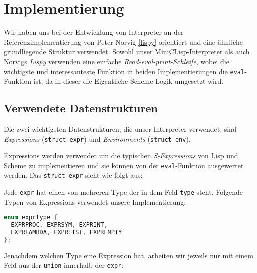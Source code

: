 \label{implementierung}
\section[Implementierung]{Implementierung}

Wir haben uns bei der Entwicklung von Interpreter an der Referenzimplementierung
von Peter Norvig \ref{lispy} orientiert und eine ähnliche grundliegende
Struktur verwendet. Sowohl unser MiniCLisp-Interpreter als auch Norvigs
\emph{Lispy} verwenden eine einfache \emph{Read-eval-print-Schleife}, wobei
die wichtigste und interessanteste Funktion in beiden Implementierungen die
\texttt{eval}-Funktion ist, da in dieser die Eigentliche Scheme-Logik
umgesetzt wird.

\subsection[Datenstrukturen]{Verwendete Datenstrukturen}
\label{datenstrukturen}
Die zwei wichtigsten Datenstrukturen, die unser Interpreter verwendet, sind 
\emph{Expressions} (\texttt{struct expr}) und \emph{Environments} (\texttt{struct env}).
\par
Expressions werden verwendet um die typischen \emph{S-Expressions} von
Lisp und Scheme zu implementieren und sie können von der \texttt{eval}-Funktion
ausgewertet werden. Das \texttt{struct expr} sieht wie folgt aus:

Jede \texttt{expr} hat einen von mehreren Type der in dem Feld \texttt{type}
steht. Folgende Typen von Expressions verwendet unsere Implementierung:
\begin{lstlisting}[language=C]
enum exprtype {
  EXPRPROC, EXPRSYM, EXPRINT,
  EXPRLAMBDA, EXPRLIST, EXPREMPTY
};
\end{lstlisting}
Jenachdem welchen Type eine Expression hat, arbeiten wir jeweils nur mit einem
Feld aus der \texttt{union} innerhalb der \texttt{expr}:

